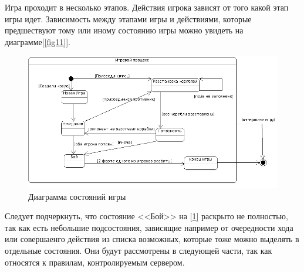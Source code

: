 Игра проходит в несколько этапов. Действия игрока зависят от того какой этап игры идет. Зависимость между этапами игры и действиями, которые предшествуют тому или иному состоянию игры можно увидеть на диаграмме[\ref{fig11}].

\begin{figure}[ht]
\centering
\includegraphics[width=18cm]{images/statecl.png}
\caption{Диаграмма состояний игры}
\label{fig12}
\end{figure}


Следует подчеркнуть, что состояние <<Бой>> на [\ref{fig12}] раскрыто не полностью, так как есть небольшие подсостояния, зависящие например от очередности хода или совершаенго действия из списка возможных, которые тоже можно выделять в отдельные состояния. Они будут рассмотрены в следующей части, так как относятся к правилам, контролируемым сервером. 
\endinput
